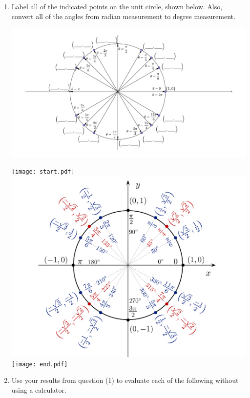 \documentclass[12pt]{article}
\begin{document}
\begin{enumerate}

\item Label all of the indicated points on the unit circle, shown below.  Also, convert all of the angles from radian measurement to degree measurement.

\begin{center}
\includegraphics[scale=0.8]{unitcircle4.pdf}
\end{center}

\texttt{[image: start.pdf]}
{{\includegraphics[scale=0.5]{unit_circle.pdf}}}
\texttt{[image: end.pdf]}


\item Use your results from question (1) to evaluate each of the following without using a calculator.

\begin{enumerate}


\end{enumerate}
\end{enumerate}
\end{document}
